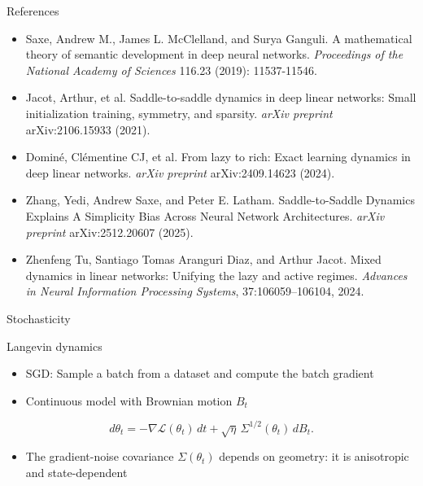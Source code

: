 \documentclass[aspectratio=169,11pt]{beamer}
\newcommand{\sectionframe}[1]{%
  \begin{frame}[plain]
    \centering
    \vfill
    {\Huge #1}
    \vfill
  \end{frame}
}
\begin{document}
\begin{frame}{References}
    \begin{itemize}
        \item Saxe, Andrew M., James L. McClelland, and Surya Ganguli. A mathematical theory of semantic development in deep neural networks. \textit{Proceedings of the National Academy of Sciences} 116.23 (2019): 11537-11546.
        \item Jacot, Arthur, et al. Saddle-to-saddle dynamics in deep linear networks: Small initialization training, symmetry, and sparsity. \textit{arXiv preprint} arXiv:2106.15933 (2021).
        \item Dominé, Clémentine CJ, et al. From lazy to rich: Exact learning dynamics in deep linear networks. \textit{arXiv preprint} arXiv:2409.14623 (2024).
        \item Zhang, Yedi, Andrew Saxe, and Peter E. Latham. Saddle-to-Saddle Dynamics Explains A Simplicity Bias Across Neural Network Architectures. \textit{arXiv preprint} arXiv:2512.20607 (2025).
        \item Zhenfeng Tu, Santiago Tomas Aranguri Diaz, and Arthur Jacot. Mixed dynamics
in linear networks: Unifying the lazy and active regimes. \textit{Advances in Neural
Information Processing Systems}, 37:106059–106104, 2024.
    \end{itemize}
\end{frame}
\sectionframe{Stochasticity}

\begin{frame}{Langevin dynamics}
  \begin{itemize}
    \item SGD: Sample a batch from a dataset and compute the batch gradient
    \item Continuous model with Brownian motion $B_t$
  \end{itemize}

  \[
    d\theta_t
    =
    -\nabla \mathcal{L}(\theta_t)\,dt
    +
    \sqrt{\eta}\,\Sigma^{1/2}(\theta_t)\,dB_t.
  \]

  \begin{itemize}
    \item The gradient-noise covariance $\Sigma(\theta_t)$ depends on geometry: it is anisotropic and state-dependent
  \end{itemize}
\end{frame}
\end{document}
